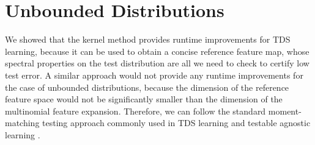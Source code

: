 \documentclass[11pt]{article} %
\numberwithin{equation}{section}
\begin{document}








    

\section{Unbounded Distributions}\label{section:unbounded}

We showed that the kernel method provides runtime improvements for TDS learning, because it can be used to obtain a concise reference feature map, whose spectral properties on the test distribution are all we need to check to certify low test error. A similar approach would not provide any runtime improvements for the case of unbounded distributions, because the dimension of the reference feature space would not be significantly smaller than the dimension of the multinomial feature expansion. Therefore, we can follow the standard moment-matching testing approach commonly used in TDS learning \cite{klivans2023testable} and testable agnostic learning \cite{rubinfeld2022testing,gollakota2022moment}.
\end{document}
